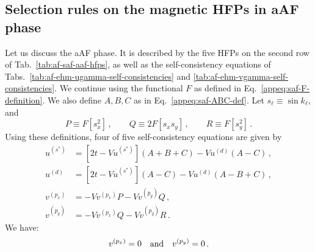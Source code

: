 \subsection{Selection rules on the magnetic HFPs in aAF phase}\label{appsubsec:af-HFPs=0-aAF}

Let us discuss the aAF phase. It is described by the five HFPs on the second row of Tab.~\ref{tab:af-saf-aaf-hfps}, as well as the self-consistency equations of Tabs.~\ref{tab:af-ehm-ugamma-self-consistencies} and \ref{tab:af-ehm-vgamma-self-consistencies}. We continue using the functional $F$ as defined in Eq.~\eqref{appeq:saf-F-definition}. We also define $A,B,C$ as in Eq.~\eqref{appeq:saf-ABC-def}. Let $s_\ell \equiv \sin k_\ell$, and
\begin{equation}\label{appeq:saf-PQR-def}
	P \equiv F\left[s_x^2\right] \, ,
	\qquad
	Q \equiv 2F\left[s_x s_y\right] \, ,
	\qquad
	R \equiv F\left[s_y^2\right] \, .
\end{equation}
Using these definitions, four of five self-consistency equations are given by
\begin{align}
	u^{(s^*)} &=
	\left[2t - Vu^{(s^*)}\right] (A+B+C) -  Vu^{(d)} (A-C) \, , \label{appeq:aaf-uS-sc-ABC} \\
	u^{(d)} &=
	\left[2t - Vu^{(s^*)}\right] (A-C) -  Vu^{(d)} (A-B+C) \, , \label{appeq:aaf-ud-sc-ABC} \\
	v^{(p_x)} &=
	- Vv^{(p_x)} P - Vv^{(p_y)} Q \, ,\label{appeq:aaf-vx-sc-PQR} \\
	v^{(p_y)} &=
	- Vv^{(p_x)} Q - Vv^{(p_y)} R \, . \label{appeq:aaf-vy-sc-PQR}
\end{align}
We have:
\begin{equation}\label{appeq:af-vx-vy-constraint}
	v^{(p_x)} = 0
	\qq{and}
	v^{(p_y)} = 0 \, .
\end{equation}

